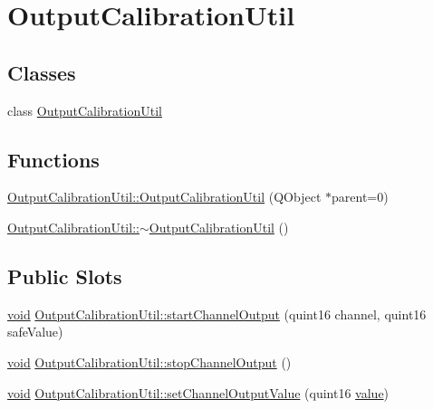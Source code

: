 \hypertarget{group___output_calibration_util}{\section{Output\-Calibration\-Util}
\label{group___output_calibration_util}
}
\subsection*{Classes}
\begin{DoxyCompactItemize}
\item 
class \hyperlink{class_output_calibration_util}{Output\-Calibration\-Util}
\end{DoxyCompactItemize}
\subsection*{Functions}
\begin{DoxyCompactItemize}
\item 
\hyperlink{group___output_calibration_util_gad4fa78a9ae7280d3f4476614ab1b75bc}{Output\-Calibration\-Util\-::\-Output\-Calibration\-Util} (Q\-Object $\ast$parent=0)
\item 
\hyperlink{group___output_calibration_util_gabc2baa99b6831e09b1a481dbdcae92ab}{Output\-Calibration\-Util\-::$\sim$\-Output\-Calibration\-Util} ()
\end{DoxyCompactItemize}
\subsection*{Public Slots}
\begin{DoxyCompactItemize}
\item 
\hyperlink{group___u_a_v_objects_plugin_ga444cf2ff3f0ecbe028adce838d373f5c}{void} \hyperlink{group___output_calibration_util_ga4e257b02b35e22c737c50cbeab039173}{Output\-Calibration\-Util\-::start\-Channel\-Output} (quint16 channel, quint16 safe\-Value)
\item 
\hyperlink{group___u_a_v_objects_plugin_ga444cf2ff3f0ecbe028adce838d373f5c}{void} \hyperlink{group___output_calibration_util_ga82c5762c4c3caeebb767eff46035ba59}{Output\-Calibration\-Util\-::stop\-Channel\-Output} ()
\item 
\hyperlink{group___u_a_v_objects_plugin_ga444cf2ff3f0ecbe028adce838d373f5c}{void} \hyperlink{group___output_calibration_util_gae8a819e164b2c70af5e6e884ffea3519}{Output\-Calibration\-Util\-::set\-Channel\-Output\-Value} (quint16 \hyperlink{glext_8h_aa0e2e9cea7f208d28acda0480144beb0}{value})
\end{DoxyCompactItemize}


